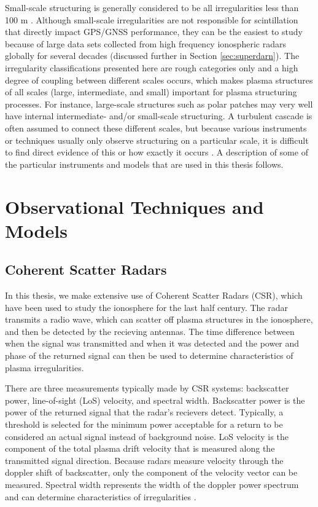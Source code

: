 Small-scale structuring is generally considered to be all irregularities less than 100 m \citep{Kelley2009}.  Although small-scale irregularities are not responsible for scintillation that directly impact GPS/GNSS performance, they can be the easiest to study because of large data sets collected from high frequency ionospheric radars globally for several decades (discussed further in Section \ref{sec:superdarn}).  The irregularity classifications presented here are rough categories only and a high degree of coupling between different scales occurs, which makes plasma structures of all scales (large, intermediate, and small) important for plasma structuring processes.  For instance, large-scale structures such as polar patches may very well have internal intermediate- and/or small-scale structuring.  A turbulent cascade is often assumed to connect these different scales, but because various instruments or techniques usually only observe structuring on a particular scale, it is difficult to find direct evidence of this or how exactly it occurs \citep{Kinter1985,Tsunoda1985}.  A description of some of the particular instruments and models that are used in this thesis follows.

\section{Observational Techniques and Models}

\subsection{Coherent Scatter Radars}
\label{sec:csr}
In this thesis, we make extensive use of Coherent Scatter Radars (CSR), which have been used to study the ionosphere for the last half century.  The radar transmits a radio wave, which can scatter off plasma structures in the ionosphere, and then be detected by the recieving antennas.  The time difference between when the signal was transmitted and when it was detected and the power and phase of the returned signal can then be used to determine characteristics of plasma irregularities.

There are three measurements typically made by CSR systems: backscatter power, line-of-sight (LoS) velocity, and spectral width.  Backscatter power is the power of the returned signal that the radar's recievers detect.  Typically, a threshold is selected for the minimum power acceptable for a return to be considered an actual signal instead of background noise.  LoS velocity is the component of the total plasma drift velocity that is measured along the transmitted signal direction.  Because radars measure velocity through the doppler shift of backscatter, only the component of the velocity vector can be measured.  Spectral width represents the width of the doppler power spectrum and can determine characteristics of irregularities \citep{Greenwald1985}.


